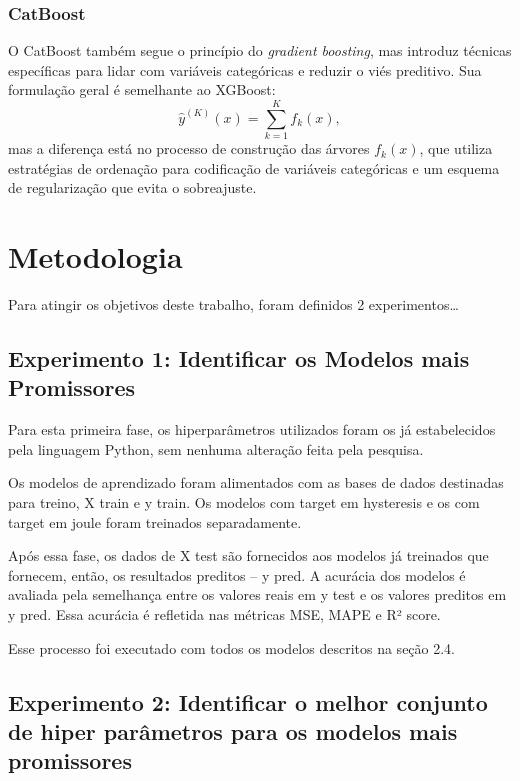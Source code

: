 \documentclass{article}
\begin{document}
\subsubsection{CatBoost}

O CatBoost também segue o princípio do \textit{gradient boosting}, mas introduz técnicas específicas para lidar com variáveis categóricas e reduzir o viés preditivo. Sua formulação geral é semelhante ao XGBoost:
\[
\hat{y}^{(K)}(x) = \sum_{k=1}^K f_k(x),
\]
mas a diferença está no processo de construção das árvores $f_k(x)$, que utiliza estratégias de ordenação para codificação de variáveis categóricas e um esquema de regularização que evita o sobreajuste.


\newpage


\section{Metodologia}

Para atingir os objetivos deste trabalho, foram definidos 2 experimentos\dots

\subsection{Experimento 1: Identificar os Modelos mais Promissores}

Para esta primeira fase, os hiperparâmetros utilizados foram os já estabelecidos pela linguagem Python, sem nenhuma alteração feita pela pesquisa.

Os modelos de aprendizado foram alimentados com as bases de dados destinadas para treino, X train e y train. Os modelos com target em hysteresis e os com target em joule foram treinados separadamente.

Após essa fase, os dados de X test são fornecidos aos modelos já treinados que fornecem, então, os resultados preditos \--- y pred. A acurácia dos modelos é avaliada pela semelhança entre os valores reais em y test e os valores preditos em y pred. Essa acurácia é refletida nas métricas MSE, MAPE e R² score.

Esse processo foi executado com todos os modelos descritos na seção 2.4.

\subsection{Experimento 2: Identificar o melhor conjunto de hiper parâmetros para os modelos mais promissores}
\end{document}
